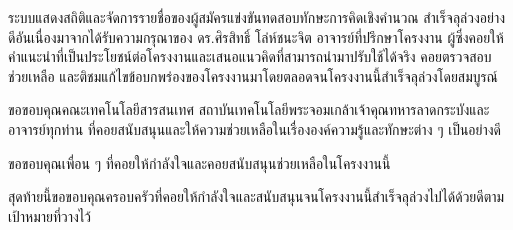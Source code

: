 ระบบแสดงสถิติและจัดการรายชื่อของผู้สมัครแข่งขันทดสอบทักษะการคิดเชิงคำนวณ สำเร็จลุล่วงอย่างดีอันเนื่องมาจากได้รับความกรุณาของ ดร.ศิรสิทธิ์ โล่ห์ชนะจิต อาจารย์ที่ปรึกษาโครงงาน ผู้ซึ่งคอยให้คำแนะนำที่เป็นประโยชน์ต่อโครงงานและเสนอแนวคิดที่สามารถนำมาปรับใช้ได้จริง คอยตรวจสอบ ช่วยเหลือ และติชมแก้ไขข้อบกพร่องของโครงงานมาโดยตลอดจนโครงงานนี้สำเร็จลุล่วงโดยสมบูรณ์

ขอขอบคุณคณะเทคโนโลยีสารสนเทศ สถาบันเทคโนโลยีพระจอมเกล้าเจ้าคุณทหารลาดกระบังและอาจารย์ทุกท่าน ที่คอยสนับสนุนและให้ความช่วยเหลือในเรื่ององค์ความรู้และทักษะต่าง ๆ เป็นอย่างดี

ขอขอบคุณเพื่อน ๆ ที่คอยให้กำลังใจและคอยสนับสนุนช่วยเหลือในโครงงานนี้

สุดท้ายนี้ขอขอบคุณครอบครัวที่คอยให้กำลังใจและสนับสนุนจนโครงงานนี้สำเร็จลุล่วงไปได้ด้วยดีตามเป้าหมายที่วางไว้